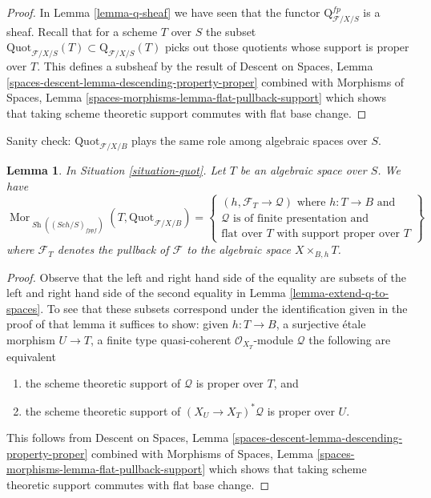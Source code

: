 \documentclass{stacks-project}
\theoremstyle{plain}
\newtheorem{lemma}[subsection]{Lemma}
\theoremstyle{definition}
\theoremstyle{remark}
\numberwithin{equation}{subsection}
\def\Sch{\mathit{Sch}}
\def\Mor{\mathop{\mathrm{Mor}}\nolimits}
\def\Sh{\mathop{\mathit{Sh}}\nolimits}
\def\Quotfunctor{\mathrm{Quot}}
\begin{document}
\begin{proof}
In Lemma \ref{lemma-q-sheaf} we have seen that the functor
$\text{Q}^{fp}_{\mathcal{F}/X/S}$ is a sheaf. Recall that for a
scheme $T$ over $S$ the subset
$\Quotfunctor_{\mathcal{F}/X/S}(T) \subset \text{Q}_{\mathcal{F}/X/S}(T)$
picks out those quotients whose support is proper over $T$.
This defines a subsheaf by the result of
Descent on Spaces, Lemma \ref{spaces-descent-lemma-descending-property-proper}
combined with
Morphisms of Spaces, Lemma \ref{spaces-morphisms-lemma-flat-pullback-support}
which shows that taking scheme theoretic support commutes
with flat base change.
\end{proof}

\noindent
Sanity check: $\Quotfunctor_{\mathcal{F}/X/B}$
plays the same role among algebraic spaces
over $S$.

\begin{lemma}
\label{lemma-extend-quot-to-spaces}
In Situation \ref{situation-quot}. Let $T$ be an algebraic space over $S$.
We have
$$
\Mor_{\Sh((\Sch/S)_{fppf})}(T,  \Quotfunctor_{\mathcal{F}/X/B}) =
\left\{
\begin{matrix}
(h, \mathcal{F}_T \to \mathcal{Q}) \text{ where }
h : T \to B \text{ and}\\
\mathcal{Q}\text{ is of finite presentation and}\\
\text{flat over }T\text{ with support proper over }T
\end{matrix}
\right\}
$$
where $\mathcal{F}_T$ denotes the pullback of $\mathcal{F}$
to the algebraic space $X \times_{B, h} T$.
\end{lemma}

\begin{proof}
Observe that the left and right hand side of the equality are
subsets of the left and right hand side of the second equality in
Lemma \ref{lemma-extend-q-to-spaces}.
To see that these subsets correspond under
the identification given in the proof of that lemma
it suffices to show: given $h : T \to B$,
a surjective \'etale morphism $U \to T$,
a finite type quasi-coherent $\mathcal{O}_{X_T}$-module $\mathcal{Q}$
the following are equivalent
\begin{enumerate}
\item the scheme theoretic support of $\mathcal{Q}$ is proper
over $T$, and
\item the scheme theoretic support of $(X_U \to X_T)^*\mathcal{Q}$
is proper over $U$.
\end{enumerate}
This follows from
Descent on Spaces, Lemma \ref{spaces-descent-lemma-descending-property-proper}
combined with
Morphisms of Spaces, Lemma \ref{spaces-morphisms-lemma-flat-pullback-support}
which shows that taking scheme theoretic support commutes
with flat base change.
\end{proof}
\end{document}
